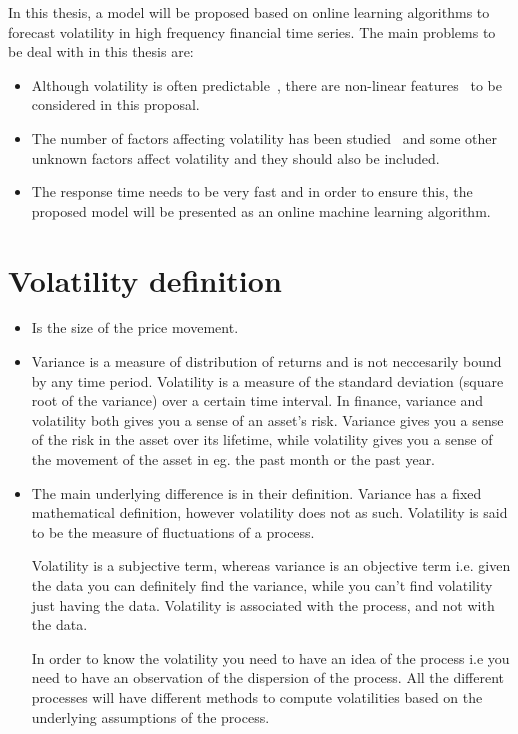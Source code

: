 In this thesis, a model will be proposed based on online learning algorithms to forecast volatility in high frequency financial time series.
The main problems to be deal with in this thesis are:

\begin{itemize}
   \item Although volatility is often predictable~\cite{poon+granger2003}, there are non-linear features~\cite{gatheral2006} to be considered in this proposal.
    \item The number of factors affecting volatility has been studied~\cite{srinivasan2009} and some other unknown factors affect volatility and they should also be included.
    \item The response time needs to be very fast and in order to ensure this, the proposed model will be presented as an online machine learning algorithm. 
\end{itemize}



\section{Volatility definition}

\begin{itemize}

\item Is the size of the price movement.

\item Variance is a measure of distribution of returns and is not neccesarily bound by any time period.
Volatility is a measure of the standard deviation (square root of the variance) over a certain time interval. In finance, variance and volatility both gives you a sense of an asset's risk. Variance gives you a sense of the risk in the asset over its lifetime, while volatility gives you a sense of the movement of the asset in eg. the past month or the past year.


\item The main underlying difference is in their definition. Variance has a fixed mathematical definition, however volatility does not as such. Volatility is said to be the measure of fluctuations of a process.

Volatility is a subjective term, whereas variance is an objective term i.e. given the data you can definitely find the variance, while you can't find volatility just having the data. Volatility is associated with the process, and not with the data.

In order to know the volatility you need to have an idea of the process i.e you need to have an observation of the dispersion of the process. All the different processes will have different methods to compute volatilities based on the underlying assumptions of the process.
\end{itemize}



